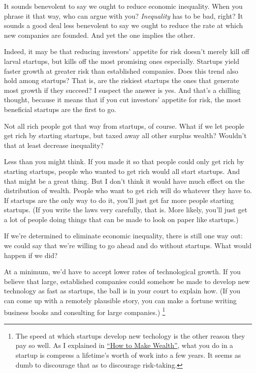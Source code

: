 It sounds benevolent to say we ought to reduce economic inequality. When
you phrase it that way, who can argue with you? \emph{Inequality} has to
be bad, right? It sounds a good deal less benevolent to say we ought to
reduce the rate at which new companies are founded. And yet the one
implies the other.

Indeed, it may be that reducing investors' appetite for risk doesn't
merely kill off larval startups, but kills off the most promising ones
especially. Startups yield faster growth at greater risk than
established companies. Does this trend also hold among startups? That
is, are the riskiest startups the ones that generate most growth if they
succeed? I suspect the answer is yes. And that's a chilling thought,
because it means that if you cut investors' appetite for risk, the most
beneficial startups are the first to go.

Not all rich people got that way from startups, of course. What if we
let people get rich by starting startups, but taxed away all other
surplus wealth? Wouldn't that at least decrease inequality?

Less than you might think. If you made it so that people could only get
rich by starting startups, people who wanted to get rich would all start
startups. And that might be a great thing. But I don't think it would
have much effect on the distribution of wealth. People who want to get
rich will do whatever they have to. If startups are the only way to do
it, you'll just get far more people starting startups. (If you write the
laws very carefully, that is. More likely, you'll just get a lot of
people doing things that can be made to look on paper like startups.)

If we're determined to eliminate economic inequality, there is still one
way out: we could say that we're willing to go ahead and do without
startups. What would happen if we did?

At a minimum, we'd have to accept lower rates of technological growth.
If you believe that large, established companies could somehow be made
to develop new technology as fast as startups, the ball is in your court
to explain how. (If you can come up with a remotely plausible story, you
can make a fortune writing business books and consulting for large
companies.) \footnote{The speed at which startups develop new techology is the other
reason they pay so well. As I explained in \href{wealth.html}{``How to
Make Wealth''}, what you do in a startup is compress a lifetime's worth
of work into a few years. It seems as dumb to discourage that as to
discourage risk-taking.}

